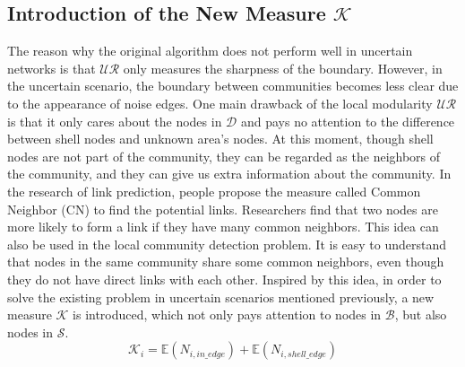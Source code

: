 \documentclass[\main/thesis.tex]{subfiles}
\begin{document}
\subsection{Introduction of the New Measure $\mathcal{K}$}
The reason why the original algorithm does not perform well in uncertain networks is that $\mathcal{UR}$ only measures the sharpness of the boundary. However, in the uncertain scenario, the boundary between communities becomes less clear due to the appearance of noise edges. One main drawback of the local modularity $\mathcal{UR}$ is that it only cares about the nodes in $\mathcal{D}$ and pays no attention to the difference between shell nodes and unknown area's nodes. At this moment, though shell nodes are not part of the community, they can be regarded as the neighbors of the community, and they can give us extra information about the community. In the research of link prediction, people propose the measure called Common Neighbor (CN) to find the potential links. Researchers find that two nodes are more likely to form a link if they have many common neighbors. This idea can also be used in the local community detection problem. It is easy to understand that nodes in the same community share some common neighbors, even though they do not have direct links with each other. Inspired by this idea, in order to solve the existing problem in uncertain scenarios mentioned previously, a new measure $\mathcal{K}$ is introduced, which not only pays attention to nodes in $\mathcal{B}$, but also nodes in $\mathcal{S}$.
\begin{equation}
\mathcal{K}_i = \mathbb{E}(N_{i,in\_edge}) + \mathbb{E}(N_{i,shell\_edge})
\end{equation}
\end{document}
